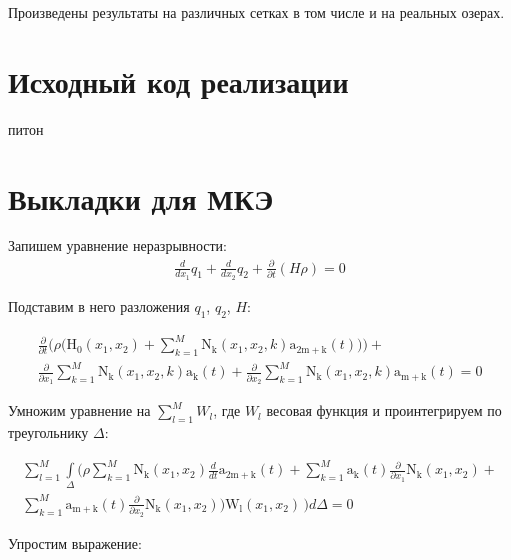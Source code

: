 \documentclass[14pt]{extreport}
\begin{document}
Произведены результаты на различных сетках в том числе и на реальных озерах.






\Appendix

\chapter{Исходный код реализации}
питон
 
 
\chapter{Выкладки для МКЭ}

Запишем уравнение неразрывности:
\begin{eqnarray}
\frac{d}{d x_{1}} q_{1} + \frac{d}{d x_{2}} q_{2} + \frac{\partial}{\partial t}\left(H \rho\right) = 0
\end{eqnarray}


Подставим в него разложения $q_1$, $q_2$, $H$:

\begin{multline*}
\frac{\partial}{\partial t}\bigg(\rho \bigg(\operatorname{H_{0}}{ (x_{1},x_{2}  )}+ \sum_{k=1}^{M} \operatorname{N_{k}}{ (x_{1},x_{2},k  )} \operatorname{a_{2m+k}}{ (t  )}\bigg)\bigg) + \\\frac{\partial}{\partial x_{1}} \sum_{k=1}^{M} \operatorname{N_{k}}{ (x_{1},x_{2},k  )} \operatorname{a_{k}}{ (t  )} + \frac{\partial}{\partial x_{2}} \sum_{k=1}^{M} \operatorname{N_{k}}{ (x_{1},x_{2},k  )} \operatorname{a_{m+k}}{ (t  )} = 0
\end{multline*}

Умножим уравнение на $\sum\limits_{l=1}^{M} W_l$, где $W_l$ весовая функция и проинтегрируем по треугольнику $\Delta$:

\begin{multline*}
\sum_{l=1}^{M} \int\limits_{\Delta} \bigg(\rho \sum_{k=1}^{M} \operatorname{N_{k}}{ (x_{1},x_{2}  )} \frac{d}{d t} \operatorname{a_{2m+k}}{ (t  )} + \sum_{k=1}^{M} \operatorname{a_{k}}{ (t  )} \frac{\partial}{\partial x_{1}} \operatorname{N_{k}}{ (x_{1},x_{2}  )} + \\ \sum_{k=1}^{M} \operatorname{a_{m+k}}{ (t  )} \frac{\partial}{\partial x_{2}} \operatorname{N_{k}}{ (x_{1},x_{2}  )}\bigg) \operatorname{W_{l}}{ (x_{1},x_{2}  )}\, \bigg)d\Delta=0
\end{multline*}


Упростим выражение:
\end{document}
